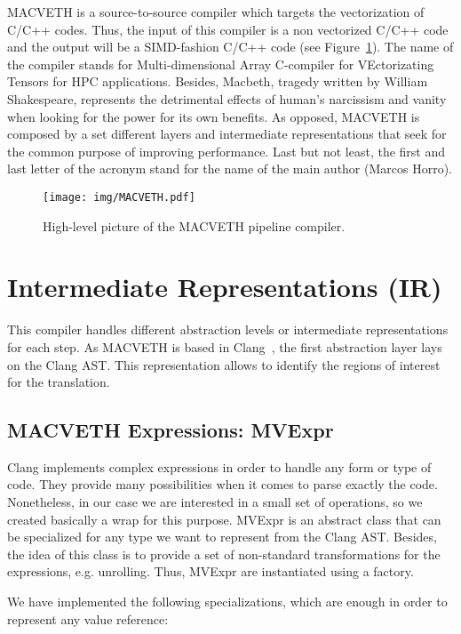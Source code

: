 \documentclass[a4paper,12pt]{memoir}
\begin{document}
MACVETH is a source-to-source compiler which targets the vectorization of C/C++
codes. Thus, the input of this compiler is a non vectorized C/C++ code and the
output will be a SIMD-fashion C/C++ code (see Figure~\ref{fig:MACVETHarch}).
The name of the compiler stands for Multi-dimensional Array C-compiler for
VEctorizating Tensors for HPC applications. Besides, Macbeth, tragedy
written by William Shakespeare, represents the detrimental effects of human's
narcissism and vanity when looking for the power for its own benefits. As
opposed, MACVETH is composed by a set different layers and intermediate
representations that seek for the common purpose of improving performance. Last
but not least, the first and last letter of the acronym stand for the name of
the main author (Marcos Horro).

\begin{figure}
	\centering
	\texttt{[image: img/MACVETH.pdf]}
	\caption{High-level picture of the MACVETH pipeline compiler.}
	\label{fig:MACVETHarch}
\end{figure}

\chapter{Intermediate Representations (IR)}



This compiler handles different abstraction levels or intermediate
representations for each step. As MACVETH is based in Clang~\cite{bib:clang},
the first abstraction layer lays on the Clang AST. This representation allows to
identify the regions of interest for the translation.

\section{MACVETH Expressions: MVExpr}
Clang implements complex expressions in order to handle any form or type of
code. They
provide many possibilities
when it comes to parse exactly the code. Nonetheless, in our case we are
interested in a small set of operations, so we created basically a wrap for this
purpose. MVExpr is an abstract class that can be specialized for any type we
want to represent from the Clang AST. Besides, the idea of this class is to
provide a set of non-standard transformations for the expressions, e.g.
unrolling. Thus, MVExpr are instantiated using a factory.

We have implemented the following specializations, which are enough in order to
represent any value reference:
\end{document}
